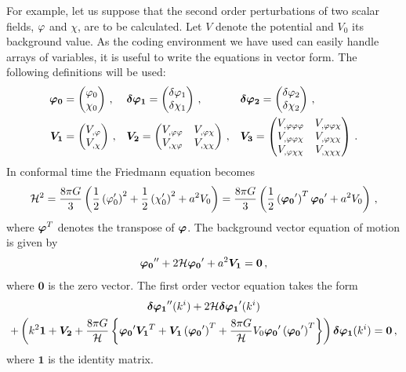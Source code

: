 For example, let us suppose that the second order perturbations of two scalar fields,
$\varphi$ and $\chi$, are to
be calculated. Let $V$ denote the potential and $V_0$ its background value. As the
coding environment we have used can easily handle arrays of variables, it is useful
to write the equations in vector form. The following definitions will be used:
% 
\begin{align}
\label{eq:vector-defns-res}
 \bm{\vp_0} &= \begin{pmatrix}
                \vp_0 \\
		\chi_0
               \end{pmatrix} \,, &
% 
 &\bm{\dvp1} = \begin{pmatrix}
                \dvp1 \\
		\delta\chi_1
               \end{pmatrix} \,, &
% 
 &\bm{\dvp2} = \begin{pmatrix}
                \dvp2 \\
		\delta\chi_2
               \end{pmatrix} \,, \\
% 
 \bm{V_1} &= \begin{pmatrix}
             \Uphi \\
	     V_{,\chi} 
            \end{pmatrix} \,, &
% 
 &\bm{V_2} = \begin{pmatrix}
             \Upp & V_{,\vp\chi} \\
	     V_{,\chi\vp} & V_{,\chi\chi}
            \end{pmatrix} \,, &
% 
&\bm{V_3} = \begin{pmatrix}
            \Uppp & V_{,\vp\vp\chi} \\
	    V_{,\vp\vp\chi} & V_{,\vp\chi\chi} \\
	    V_{,\vp\chi\chi} & V_{,\chi\chi\chi}
           \end{pmatrix} \,.
\end{align}
% 
In conformal time the Friedmann equation becomes
% 
\begin{equation}
 \H^2 = \frac{8\pi G}{3} \left( \frac{1}{2}\left(\vp_0'\right)^2 
        + \frac{1}{2}\left(\chi_0'\right)^2 + a^2 \U \right) 
% 
= \frac{8\pi G}{3}\left( \frac{1}{2} \left( \bm{\vp_0}' \right)^{T} \bm{\vp_0}' + a^2 \U \right) \,,
\end{equation}
% 
where $\boldsymbol{\varphi}^{T}$ denotes the transpose of $\boldsymbol{\varphi}$.
% 
The background vector equation of motion is given by
% 
\begin{equation}
 \boldsymbol{\varphi_0}'' + 2\mathcal{H} \boldsymbol{\varphi_0}' + a^2 \boldsymbol{V_1} = \boldsymbol{0}\,,
\end{equation}
% 
where $\bm{0}$ is the zero vector.
The first order vector equation takes the form
% 
\begin{multline}
 \boldsymbol{\delta\varphi_{1}}''(k^i) + 2\mathcal{H} \boldsymbol{\delta\varphi_{1}}'(k^i) \\
 + \left( k^2 \boldsymbol{1}  + \boldsymbol{V_2} 
 + \frac{8\pi G}{\mathcal{H}}\left\{ 
  \boldsymbol{\varphi_0}' \boldsymbol{V_1}^{T} + \boldsymbol{V_1}\left(\boldsymbol{\varphi_0}'\right)^T
  + \frac{8\pi G}{\mathcal{H}}V_{0} \boldsymbol{\varphi_0}' \left(\boldsymbol{\varphi_0}'\right)^T
\right\}
\right)\boldsymbol{\delta\varphi_{1}}(k^i) = \boldsymbol{0}\,,
\end{multline}
% 
where $\bm{1}$ is the identity matrix.


